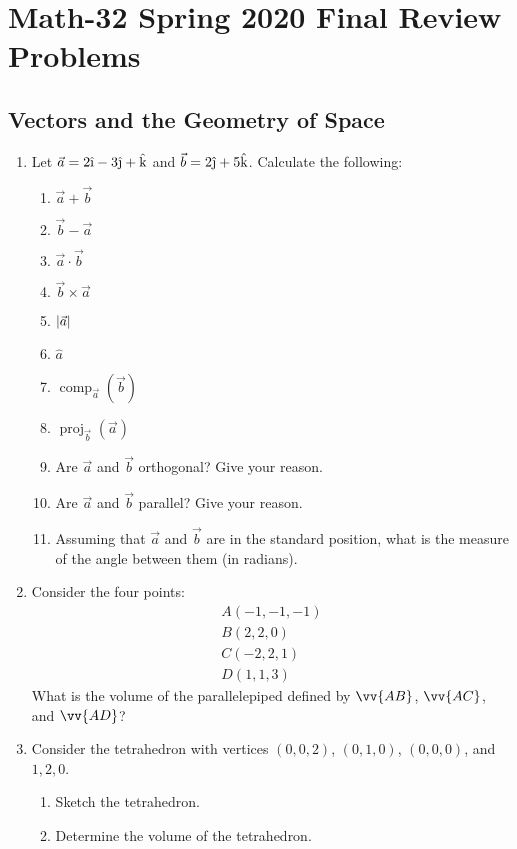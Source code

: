 \documentclass[letterpaper,12pt,fleqn]{article}
\newcommand{\uv}[1]{\hat{#1}}
\newcommand{\iv}{\uv{\text{\i}}}
\newcommand{\jv}{\uv{\text{\j}}}
\newcommand{\kv}{\uv{\text{k}}}
\DeclarePairedDelimiter{\abs}{\lvert}{\rvert}
\DeclareMathOperator{\comp}{comp}
\DeclareMathOperator{\proj}{proj}
\begin{document}
\section*{Math-32 Spring 2020 Final Review Problems}

\subsection*{Vectors and the Geometry of Space}

\begin{enumerate}
\item Let \(\vec{a}=2\iv-3\jv+\kv\) and \(\vec{b}=2\jv+5\kv\).  Calculate the following:
  \begin{enumerate}
  \item \(\vec{a}+\vec{b}\)
  \item \(\vec{b}-\vec{a}\)
  \item \(\vec{a}\cdot\vec{b}\)
  \item \(\vec{b}\times\vec{a}\)
  \item \(\abs{\vec{a}}\)
  \item \(\uv{a}\)
  \item \(\comp_{\vec{a}}(\vec{b})\)
  \item \(\proj_{\vec{b}}(\vec{a})\)
  \item Are \(\vec{a}\) and \(\vec{b}\) orthogonal?  Give your reason.
  \item Are \(\vec{a}\) and \(\vec{b}\) parallel?  Give your reason.
  \item Assuming that \(\vec{a}\) and \(\vec{b}\) are in the standard position, what is the measure of the
    angle between them (in radians).
  \end{enumerate}

\item Consider the four points:
  \begin{gather*}
    A(-1,-1,-1) \\
    B(2,2,0) \\
    C(-2,2,1) \\
    D(1,1,3)
  \end{gather*}
  What is the volume of the parallelepiped defined by \(\vv{AB}\), \(\vv{AC}\), and \(\vv{AD}\)?

\item Consider the tetrahedron with vertices \((0,0,2)\), \((0,1,0)\), \((0,0,0)\), and \(1,2,0\).
  \begin{enumerate}
  \item Sketch the tetrahedron.
  \item Determine the volume of the tetrahedron.
  \end{enumerate}


\end{enumerate}
\end{document}
